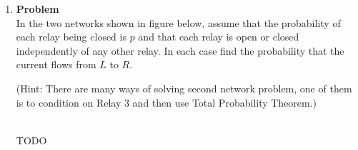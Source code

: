 \documentclass[12pt]{article}
\newenvironment{Ex}{\textbf{Problem}\vspace{.75em}\\}{}
\begin{document}
\begin{enumerate}
\begin{Ex}
\begin{solution}
\begin{enumerate}
          try is $\frac{1}{n-(k-1)}$.
        \item If Bob does not throw away the previously tried keys,
          then the probability that he will open the door is $n!$.
        \end{enumerate}
      \end{solution}
    \end{Ex}
  \item
    \begin{Ex}
      In the two networks shown in figure below, assume that the
      probability of each relay being closed is $p$ and that each
      relay is open or closed independently of any other relay. In
      each case find the probability that the current flows from $L$
      to $R$.

      (Hint: There are many ways of solving second network problem,
      one of them is to condition on Relay 3 and then use Total
      Probability Theorem.)
      \begin{solution} \hfill \\
        {\huge TODO}
      \end{solution}
    \end{Ex}
\end{enumerate}
\end{document}
